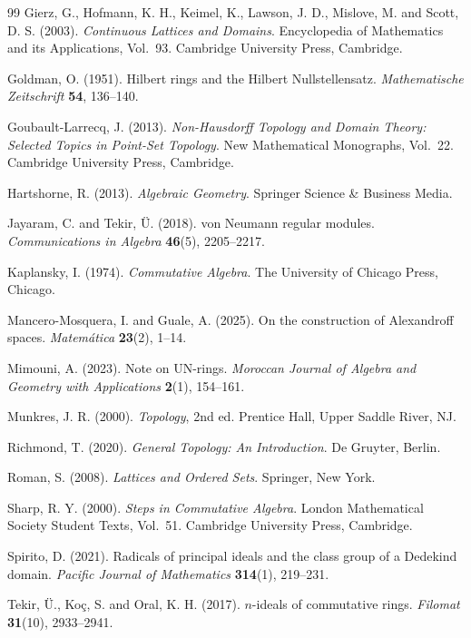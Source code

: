 \documentclass[11pt]{amsart}
\theoremstyle{plain}
\theoremstyle{definition}
\theoremstyle{remark}
\numberwithin{equation}{section}
\begin{document}
\begin{thebibliography}{99}
	Gierz, G., Hofmann, K. H., Keimel, K., Lawson, J. D.,
	Mislove, M. and Scott, D. S. (2003).
	\textit{Continuous Lattices and Domains}.
	Encyclopedia of Mathematics and its Applications, Vol.~93.
	Cambridge University Press, Cambridge.
	
	Goldman, O. (1951).
	Hilbert rings and the Hilbert Nullstellensatz.
	\textit{Mathematische Zeitschrift}
	\textbf{54}, 136--140.
	
	Goubault-Larrecq, J. (2013).
	\textit{Non-Hausdorff Topology and Domain Theory:
		Selected Topics in Point-Set Topology}.
	New Mathematical Monographs, Vol.~22.
	Cambridge University Press, Cambridge.
	
	Hartshorne, R. (2013).
	\textit{Algebraic Geometry}.
	Springer Science \& Business Media.
	
	Jayaram, C. and Tekir, \"U. (2018).
	von Neumann regular modules.
	\textit{Communications in Algebra}
	\textbf{46}(5), 2205--2217.
	
	Kaplansky, I. (1974).
	\textit{Commutative Algebra}.
	The University of Chicago Press, Chicago.
	
	Mancero-Mosquera, I. and Guale, A. (2025).
	On the construction of Alexandroff spaces.
	\textit{Matem\'atica}
	\textbf{23}(2), 1--14.
	
	Mimouni, A. (2023).
	Note on UN-rings.
	\textit{Moroccan Journal of Algebra and Geometry with Applications}
	\textbf{2}(1), 154--161.
	
	Munkres, J. R. (2000).
	\textit{Topology}, 2nd ed.
	Prentice Hall, Upper Saddle River, NJ.
	
	Richmond, T. (2020).
	\textit{General Topology: An Introduction}.
	De Gruyter, Berlin.
	
	Roman, S. (2008).
	\textit{Lattices and Ordered Sets}.
	Springer, New York.
	
	Sharp, R. Y. (2000).
	\textit{Steps in Commutative Algebra}.
	London Mathematical Society Student Texts, Vol.~51.
	Cambridge University Press, Cambridge.
	
	Spirito, D. (2021).
	Radicals of principal ideals and the class group of a Dedekind domain.
	\textit{Pacific Journal of Mathematics} \textbf{314}(1), 219--231.
	
	Tekir, \"U., Ko\c{c}, S. and Oral, K. H. (2017).
	$n$-ideals of commutative rings.
	\textit{Filomat}
	\textbf{31}(10), 2933--2941.
	

\end{thebibliography}
\end{document}
